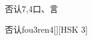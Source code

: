 \begin{entry}{否认}{7,4}{⼝、⾔}
  \begin{phonetics}{否认}{fou3ren4}[][HSK 3]
  \end{phonetics}
\end{entry}
